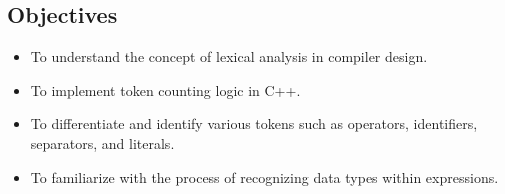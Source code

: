 \documentclass[12pt]{article}
\begin{document}
\subsection*{Objectives}
\begin{itemize}
    \item To understand the concept of lexical analysis in compiler design.
    \item To implement token counting logic in C++.
    \item To differentiate and identify various tokens such as operators, identifiers, separators, and literals.
    \item To familiarize with the process of recognizing data types within expressions.
\end{itemize}
\end{document}
